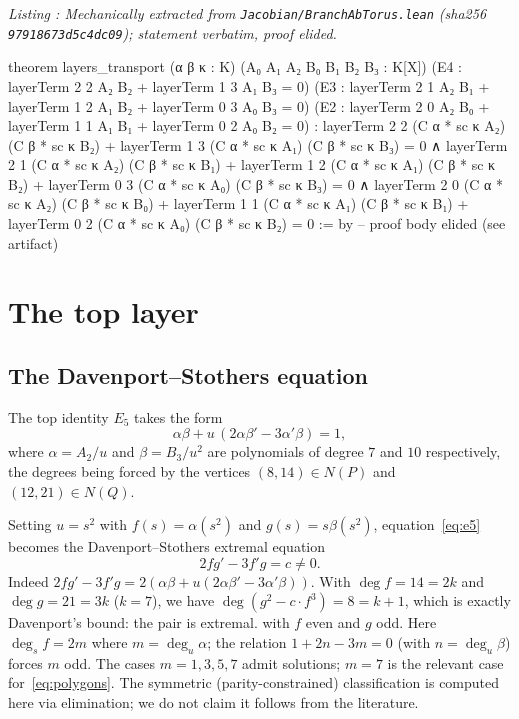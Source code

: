 \documentclass[a4paper,11pt]{article}
\newcounter{leanlisting}
\newenvironment{leanlisting}[2]{%
  \refstepcounter{leanlisting}\label{#2}%
  \begin{center}\textit{\small Listing \theleanlisting: #1}\end{center}%
  \Verbatim[breaklines=true,breakanywhere=true,fontsize=\footnotesize,frame=single,framesep=4pt,rulecolor=\color{gray!50},fillcolor=\color{gray!5}]%
}{%
  \endVerbatim%
}
\theoremstyle{plain}
\theoremstyle{definition}
\theoremstyle{remark}
\begin{document}
\begin{leanlisting}{Mechanically extracted from \texttt{Jacobian/BranchAbTorus.lean} (sha256 \texttt{97918673d5c4dc09}); statement verbatim, proof elided.}{lst:torus}
theorem layers_transport (α β κ : K) (A₀ A₁ A₂ B₀ B₁ B₂ B₃ : K[X])
    (E4 : layerTerm 2 2 A₂ B₂ + layerTerm 1 3 A₁ B₃ = 0)
    (E3 : layerTerm 2 1 A₂ B₁ + layerTerm 1 2 A₁ B₂ + layerTerm 0 3 A₀ B₃ = 0)
    (E2 : layerTerm 2 0 A₂ B₀ + layerTerm 1 1 A₁ B₁ + layerTerm 0 2 A₀ B₂ = 0) :
    layerTerm 2 2 (C α * sc κ A₂) (C β * sc κ B₂) + layerTerm 1 3 (C α * sc κ A₁) (C β * sc κ B₃) = 0 ∧
    layerTerm 2 1 (C α * sc κ A₂) (C β * sc κ B₁) + layerTerm 1 2 (C α * sc κ A₁) (C β * sc κ B₂) +
      layerTerm 0 3 (C α * sc κ A₀) (C β * sc κ B₃) = 0 ∧
    layerTerm 2 0 (C α * sc κ A₂) (C β * sc κ B₀) + layerTerm 1 1 (C α * sc κ A₁) (C β * sc κ B₁) +
      layerTerm 0 2 (C α * sc κ A₀) (C β * sc κ B₂) = 0 := by
  -- proof body elided (see artifact)
\end{leanlisting}

\section{The top layer}\label{sec:top}

\subsection{The Davenport--Stothers equation}

The top identity $E_5$ takes the form
\begin{equation}\label{eq:e5}
\alpha\beta+u\,(2\alpha\beta'-3\alpha'\beta)=1,
\end{equation}
where $\alpha=A_2/u$ and $\beta=B_3/u^2$ are polynomials of degree $7$ and $10$ respectively, the degrees being forced by the vertices $(8,14)\in N(P)$ and $(12,21)\in N(Q)$.

Setting $u=s^2$ with $f(s)=\alpha(s^2)$ and $g(s)=s\beta(s^2)$, equation~\eqref{eq:e5} becomes the Davenport--Stothers extremal equation~\cite{Stothers,Davenport}
\begin{equation}
2fg'-3f'g=c\neq0.
\end{equation}
Indeed $2fg'-3f'g=2(\alpha\beta+u(2\alpha\beta'-3\alpha'\beta))$. With $\deg f=14=2k$ and $\deg g=21=3k$ ($k=7$), we have $\deg(g^2-c\cdot f^3)=8=k+1$, which is exactly Davenport's bound: the pair is extremal.
with $f$ even and $g$ odd. Here $\deg_s f = 2m$ where $m=\deg_u\alpha$; the relation $1+2n-3m=0$ (with $n=\deg_u\beta$) forces $m$ odd. The cases $m=1,3,5,7$ admit solutions; $m=7$ is the relevant case for~\eqref{eq:polygons}. The symmetric (parity-constrained) classification is computed here via elimination; we do not claim it follows from the literature.
\end{document}
